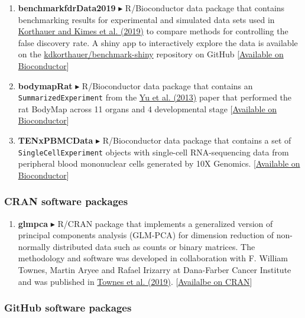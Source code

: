 \documentclass[10pt]{article}
\newcommand{\myben}[1]{\smallskip\begin{enumerate}[start=1,label={\scriptsize \arabic*$\ $},leftmargin=\parindent]\setlength{\itemsep}{#1}\vspace*{-0.7em}}
\newcommand{\ee}{\end{enumerate}}
\begin{document}
\myben{0.4em}

\item 
{\bf benchmarkfdrData2019} $\blacktriangleright$
R/Bioconductor data package that contains benchmarking results for experimental and simulated data sets used in \href{https://doi.org/10.1186/s13059-019-1716-1}{Korthauer and Kimes et al. (2019)} to compare methods for controlling the false discovery rate. A shiny app to interactively explore the data is available on the \href{https://github.com/kdkorthauer/benchmarkfdr-shiny}{kdkorthauer/benchmark-shiny} repository on GitHub [\href{http://bioconductor.org/packages/benchmarkfdrData2019}{Available on Bioconductor}] 
\item
{\bf bodymapRat} $\blacktriangleright$
R/Bioconductor data package that contains an \texttt{SummarizedExperiment} from the \href{https://www.ncbi.nlm.nih.gov/pubmed/24510058}{Yu et al. (2013)} paper that performed the rat BodyMap across 11 organs and 4 developmental stage [\href{http://www.bioconductor.org/packages/bodymapRat}{Available on Bioconductor}]
\item
{\bf TENxPBMCData} $\blacktriangleright$
R/Bioconductor data package that contains a set of \texttt{SingleCellExperiment} objects with single-cell RNA-sequencing data from peripheral blood mononuclear cells generated by 10X Genomics.  [\href{http://www.bioconductor.org/packages/TENxPBMCData}{Available on Bioconductor}]

\ee


\subsubsection*{CRAN software packages}

\myben{0.4em}

\item 
{\bf glmpca} $\blacktriangleright$
R/CRAN package that implements a generalized version of principal components analysis (GLM-PCA) for dimension reduction of non-normally distributed data such as counts or binary matrices. The methodology and software was developed in collaboration with F. William Townes, Martin Aryee and Rafael Irizarry at Dana-Farber Cancer Institute and was published in \href{https://doi.org/10.1186/s13059-019-1861-6}{Townes et al. (2019)}. [\href{https://cran.r-project.org/web/packages/glmpca/index.html}{Availalbe on CRAN}]
\ee

\subsubsection*{GitHub software packages}
\end{document}
